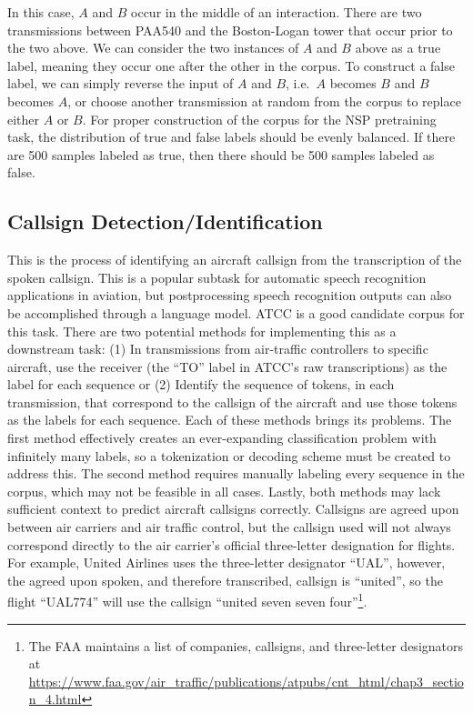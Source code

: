 \documentclass[12pt]{article}
\begin{document}
\noindent
In this case, $A$ and $B$ occur in the middle of an interaction. There are two transmissions between PAA540 and the Boston-Logan tower that occur prior
to the two above. We can consider the two instances of $A$ and $B$ above as a true label, meaning they occur one after the other in the corpus. To
construct a false label, we can simply reverse the input of $A$ and $B$, i.e.~$A$ becomes $B$ and $B$ becomes $A$, or choose another transmission at
random from the corpus to replace either $A$ or $B$. For proper construction of the corpus for the NSP pretraining task, the distribution of true and
false labels should be evenly balanced. If there are 500 samples labeled as true, then there should be 500 samples labeled as false.

\subsection{Callsign Detection/Identification}
This is the process of identifying an aircraft callsign from the transcription of the spoken callsign. This is a popular subtask for automatic speech
recognition applications in aviation, but postprocessing speech recognition outputs can also be accomplished through a language model. ATCC is a good
candidate corpus for this task. There are two potential methods for implementing this as a downstream task: (1) In transmissions from air-traffic
controllers to specific aircraft, use the receiver (the ``TO'' label in ATCC's raw transcriptions) as the label for each sequence or (2) Identify the
sequence of tokens, in each transmission, that correspond to the callsign of the aircraft and use those tokens as the labels for each sequence. Each
of these methods brings its problems. The first method effectively creates an ever-expanding classification problem with infinitely many labels, so a
tokenization or decoding scheme must be created to address this. The second method requires manually labeling every sequence in the corpus, which may
not be feasible in all cases. Lastly, both methods may lack sufficient context to predict aircraft callsigns correctly. Callsigns are agreed upon
between air carriers and air traffic control, but the callsign used will not always correspond directly to the air carrier's official three-letter
designation for flights. For example, United Airlines uses the three-letter designator ``UAL'', however, the agreed upon spoken, and therefore
transcribed, callsign is ``united'', so the flight ``UAL774'' will use the callsign ``united seven seven four''\footnote{The FAA maintains a list of
    companies, callsigns, and three-letter designators at \url{https://www.faa.gov/air_traffic/publications/atpubs/cnt_html/chap3_section_4.html}}.
\end{document}
